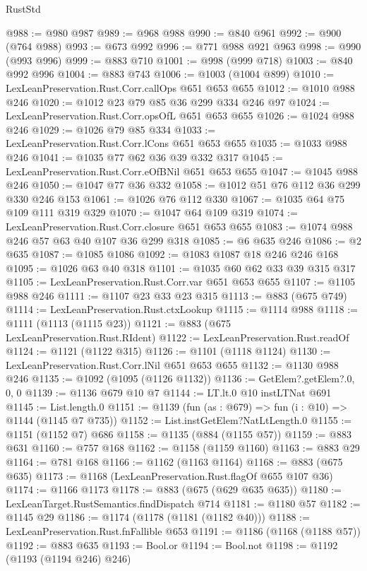 \begin{lexlean}{RustStd}
\begin{coremodule}
@988 := @980 @987
@989 := @968 @988
@990 := @840 @961
@992 := @900 (@764 @988)
@993 := @673 @992
@996 := @771 @988 @921 @963
@998 := @990 (@993 @996)
@999 := @883 @710
@1001 := @998 (@999 @718)
@1003 := @840 @992 @996
@1004 := @883 @743
@1006 := @1003 (@1004 @899)
@1010 := LexLeanPreservation.Rust.Corr.callOps @651 @653 @655
@1012 := @1010 @988 @246
@1020 := @1012 @23 @79 @85 @36 @299 @334 @246 @97
@1024 := LexLeanPreservation.Rust.Corr.opsOfL @651 @653 @655
@1026 := @1024 @988 @246
@1029 := @1026 @79 @85 @334
@1033 := LexLeanPreservation.Rust.Corr.lCons @651 @653 @655
@1035 := @1033 @988 @246
@1041 := @1035 @77 @62 @36 @39 @332 @317
@1045 := LexLeanPreservation.Rust.Corr.eOfBNil @651 @653 @655
@1047 := @1045 @988 @246
@1050 := @1047 @77 @36 @332
@1058 := @1012 @51 @76 @112 @36 @299 @330 @246 @153
@1061 := @1026 @76 @112 @330
@1067 := @1035 @64 @75 @109 @111 @319 @329
@1070 := @1047 @64 @109 @319
@1074 := LexLeanPreservation.Rust.Corr.closure @651 @653 @655
@1083 := @1074 @988 @246 @57 @63 @40 @107 @36 @299 @318
@1085 := @6 @635 @246
@1086 := @2 @635
@1087 := @1085 @1086
@1092 := @1083 @1087 @18 @246 @246 @168
@1095 := @1026 @63 @40 @318
@1101 := @1035 @60 @62 @33 @39 @315 @317
@1105 := LexLeanPreservation.Rust.Corr.var @651 @653 @655
@1107 := @1105 @988 @246
@1111 := @1107 @23 @33 @23 @315
@1113 := @883 (@675 @749)
@1114 := LexLeanPreservation.Rust.ctxLookup
@1115 := @1114 @988
@1118 := @1111 (@1113 (@1115 @23))
@1121 := @883 (@675 LexLeanPreservation.Rust.RIdent)
@1122 := LexLeanPreservation.Rust.readOf
@1124 := @1121 (@1122 @315)
@1126 := @1101 (@1118 @1124)
@1130 := LexLeanPreservation.Rust.Corr.lNil @651 @653 @655
@1132 := @1130 @988 @246
@1135 := @1092 (@1095 (@1126 @1132))
@1136 := GetElem?.getElem?.{0, 0, 0}
@1139 := @1136 @679 @10 @7
@1144 := LT.lt.{0} @10 instLTNat @691
@1145 := List.length.{0}
@1151 := @1139 (fun (as : @679) => fun (i : @10) => @1144 (@1145 @7 @735))
@1152 := List.instGetElem?NatLtLength.{0}
@1155 := @1151 (@1152 @7) @686
@1158 := @1135 (@884 (@1155 @57))
@1159 := @883 @631
@1160 := @757 @168
@1162 := @1158 (@1159 @1160)
@1163 := @883 @29
@1164 := @781 @168
@1166 := @1162 (@1163 @1164)
@1168 := @883 (@675 @635)
@1173 := @1168 (LexLeanPreservation.Rust.flagOf @655 @107 @36)
@1174 := @1166 @1173
@1178 := @883 (@675 (@629 @635 @635))
@1180 := LexLeanTarget.RustSemantics.findDispatch @714
@1181 := @1180 @57
@1182 := @1145 @29
@1186 := @1174 (@1178 (@1181 (@1182 @40)))
@1188 := LexLeanPreservation.Rust.fnFallible @653
@1191 := @1186 (@1168 (@1188 @57))
@1192 := @883 @635
@1193 := Bool.or
@1194 := Bool.not
@1198 := @1192 (@1193 (@1194 @246) @246)

\end{coremodule}
\end{lexlean}
